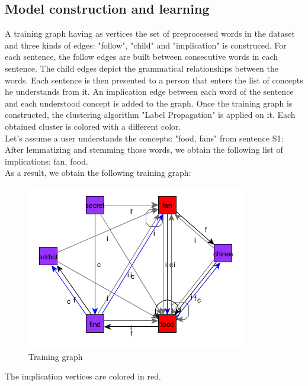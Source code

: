 \subsection{Model construction and learning}
A training graph having as vertices the set of preprocessed words in the dataset and three kinds of edges: "follow", "child" and "implication" is construced.
For each sentence, the follow edges are built between consecutive words in each sentence. The child edges depict the grammatical relationships between the words. Each sentence is then presented to a person that enters the list of concepts he understands from it. An implication edge between each word of the sentence and each understood concept is added to the graph.
Once the training graph is constructed, the clustering algorithm "Label Propagation" is applied on it. Each obtained cluster is colored with a different color. \\
Let's assume a user understands the concepts:  "food, fans" from sentence S1:\\
After lemmatizing and stemming those words, we obtain the following list of implications: fan, food. \\
As a result, we obtain the following training graph:



\begin{figure}[!hb]
	  \centering
	  \includegraphics[scale=0.6]{graphics/sentence.png} 
	  \caption{Training graph}
	  \label{fig:trainingGraph}
\end{figure}
The implication vertices are colored in red.	  


